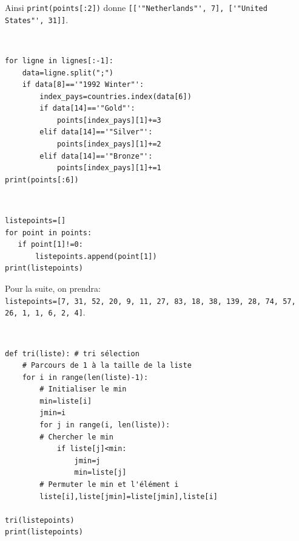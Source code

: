 Ainsi \verb?print(points[:2])? donne \verb?[['"Netherlands"', 7], ['"United States"', 31]]?.

\begin{solution}~\ \\
\begin{verbatim}
for ligne in lignes[:-1]:
    data=ligne.split(";")
    if data[8]=='"1992 Winter"':
        index_pays=countries.index(data[6])
        if data[14]=='"Gold"':
            points[index_pays][1]+=3
        elif data[14]=='"Silver"':
            points[index_pays][1]+=2
        elif data[14]=='"Bronze"':
            points[index_pays][1]+=1
print(points[:6])
\end{verbatim}
\end{solution}


\begin{solution}~\ \\
\begin{verbatim}
listepoints=[]
for point in points:
   if point[1]!=0:
       listepoints.append(point[1])
print(listepoints)
\end{verbatim}
\end{solution}

Pour la suite, on prendra:\\
 \verb?listepoints=[7, 31, 52, 20, 9, 11, 27, 83, 18, 38, 139, 28, 74, 57, 26, 1, 1, 6, 2, 4]?.


\begin{solution}~\ \\
\begin{verbatim}
def tri(liste): # tri sélection
    # Parcours de 1 à la taille de la liste
    for i in range(len(liste)-1):
        # Initialiser le min
        min=liste[i]
        jmin=i
        for j in range(i, len(liste)):
        # Chercher le min
            if liste[j]<min:
                jmin=j
                min=liste[j]
        # Permuter le min et l'élément i
        liste[i],liste[jmin]=liste[jmin],liste[i]

tri(listepoints)
print(listepoints)
\end{verbatim}
\end{solution}

